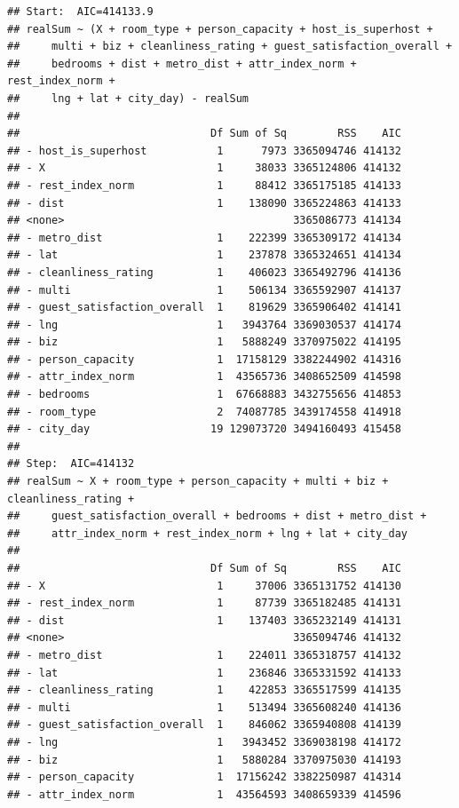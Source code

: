 \documentclass[
]{article}
\begin{document}
\begin{verbatim}
## Start:  AIC=414133.9
## realSum ~ (X + room_type + person_capacity + host_is_superhost + 
##     multi + biz + cleanliness_rating + guest_satisfaction_overall + 
##     bedrooms + dist + metro_dist + attr_index_norm + rest_index_norm + 
##     lng + lat + city_day) - realSum
## 
##                              Df Sum of Sq        RSS    AIC
## - host_is_superhost           1      7973 3365094746 414132
## - X                           1     38033 3365124806 414132
## - rest_index_norm             1     88412 3365175185 414133
## - dist                        1    138090 3365224863 414133
## <none>                                    3365086773 414134
## - metro_dist                  1    222399 3365309172 414134
## - lat                         1    237878 3365324651 414134
## - cleanliness_rating          1    406023 3365492796 414136
## - multi                       1    506134 3365592907 414137
## - guest_satisfaction_overall  1    819629 3365906402 414141
## - lng                         1   3943764 3369030537 414174
## - biz                         1   5888249 3370975022 414195
## - person_capacity             1  17158129 3382244902 414316
## - attr_index_norm             1  43565736 3408652509 414598
## - bedrooms                    1  67668883 3432755656 414853
## - room_type                   2  74087785 3439174558 414918
## - city_day                   19 129073720 3494160493 415458
## 
## Step:  AIC=414132
## realSum ~ X + room_type + person_capacity + multi + biz + cleanliness_rating + 
##     guest_satisfaction_overall + bedrooms + dist + metro_dist + 
##     attr_index_norm + rest_index_norm + lng + lat + city_day
## 
##                              Df Sum of Sq        RSS    AIC
## - X                           1     37006 3365131752 414130
## - rest_index_norm             1     87739 3365182485 414131
## - dist                        1    137403 3365232149 414131
## <none>                                    3365094746 414132
## - metro_dist                  1    224011 3365318757 414132
## - lat                         1    236846 3365331592 414133
## - cleanliness_rating          1    422853 3365517599 414135
## - multi                       1    513494 3365608240 414136
## - guest_satisfaction_overall  1    846062 3365940808 414139
## - lng                         1   3943452 3369038198 414172
## - biz                         1   5880284 3370975030 414193
## - person_capacity             1  17156242 3382250987 414314
## - attr_index_norm             1  43564593 3408659339 414596

\end{verbatim}
\end{document}
